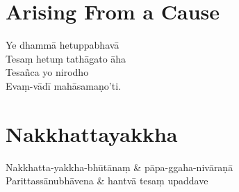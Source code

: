 
\section{Arising From a Cause}


\begin{paritta}
Ye dhammā hetuppabhavā\\
Tesaṃ hetuṃ tathāgato āha\\
Tesañca yo nirodho\\
Evaṃ-vādī mahāsamaṇo'ti.
\end{paritta}



\section{Nakkhattayakkha}



\begin{twochants}
  Nakkhatta-yakkha-bhūtānaṃ & pāpa-ggaha-nivāraṇā\\
  Parittassānubhāvena & hantvā tesaṃ upaddave\\
\end{twochants}

